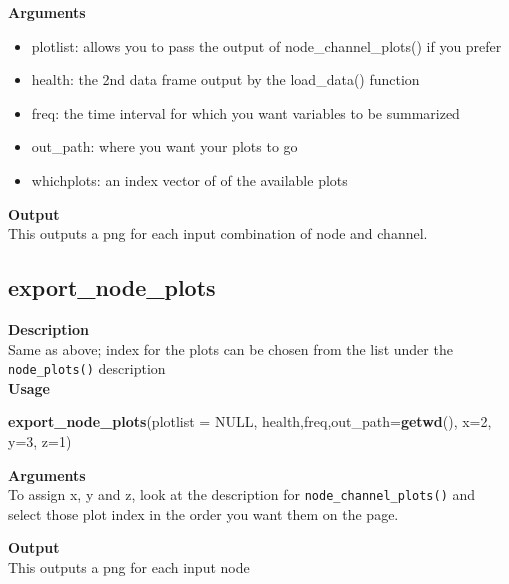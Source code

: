 \documentclass[
]{book}
\newenvironment{Shaded}{\begin{snugshade}}{\end{snugshade}}
\newcommand{\AttributeTok}[1]{\textcolor[rgb]{0.13,0.29,0.53}{#1}}
\newcommand{\ConstantTok}[1]{\textcolor[rgb]{0.56,0.35,0.01}{#1}}
\newcommand{\DecValTok}[1]{\textcolor[rgb]{0.00,0.00,0.81}{#1}}
\newcommand{\FunctionTok}[1]{\textcolor[rgb]{0.13,0.29,0.53}{\textbf{#1}}}
\newcommand{\NormalTok}[1]{#1}
\providecommand{\tightlist}{%
  \setlength{\itemsep}{0pt}\setlength{\parskip}{0pt}}
\begin{document}
\textbf{Arguments}

\begin{itemize}
\tightlist
\item
  plotlist: allows you to pass the output of node\_channel\_plots() if you prefer\\
\item
  health: the 2nd data frame output by the load\_data() function\\
\item
  freq: the time interval for which you want variables to be summarized\\
\item
  out\_path: where you want your plots to go\\
\item
  whichplots: an index vector of of the available plots
\end{itemize}

\textbf{Output}\\
This outputs a png for each input combination of node and channel.

\subsection{export\_node\_plots}\label{export_node_plots}

\textbf{Description}\\
Same as above; index for the plots can be chosen from the list under the \texttt{node\_plots()} description\\
\textbf{Usage}

\begin{Shaded}
\begin{Highlighting}[]
\FunctionTok{export\_node\_plots}\NormalTok{(}\AttributeTok{plotlist =} \ConstantTok{NULL}\NormalTok{, health,freq,}\AttributeTok{out\_path=}\FunctionTok{getwd}\NormalTok{(), }\AttributeTok{x=}\DecValTok{2}\NormalTok{, }\AttributeTok{y=}\DecValTok{3}\NormalTok{, }\AttributeTok{z=}\DecValTok{1}\NormalTok{)  }
\end{Highlighting}
\end{Shaded}

\textbf{Arguments}\\
To assign x, y and z, look at the description for \texttt{node\_channel\_plots()} and select those plot index in the order you want them on the page.

\textbf{Output}\\
This outputs a png for each input node
\end{document}
